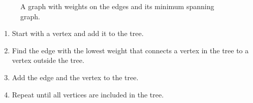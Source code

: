 \documentclass[11pt]{article}
\begin{document}
\begin{figure}[H]
    \caption{A graph with weights on the edges and its minimum spanning graph.}
    \label{fig:prim_algorithm_example}
\end{figure}

\begin{enumerate}
    \item Start with a vertex and add it to the tree.
    \item Find the edge with the lowest weight that connects a vertex in the tree to a vertex outside the tree.
    \item Add the edge and the vertex to the tree.
    \item Repeat until all vertices are included in the tree.
\end{enumerate}
\end{document}
